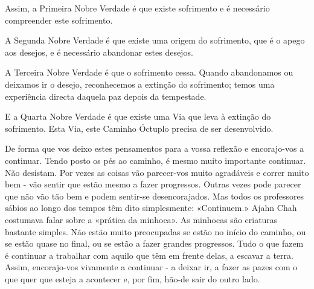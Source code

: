 Assim, a Primeira Nobre Verdade é que existe sofrimento e é necessário
compreender este sofrimento.

A Segunda Nobre Verdade é que existe uma origem do sofrimento, que é o
apego aos desejos, e é necessário abandonar estes desejos.

A Terceira Nobre Verdade é que o sofrimento cessa. Quando abandonamos ou
deixamos ir o desejo, reconhecemos a extinção do sofrimento; temos uma
experiência directa daquela paz depois da tempestade.

E a Quarta Nobre Verdade é que existe uma Via que leva à extinção do
sofrimento. Esta Via, este Caminho Óctuplo precisa de ser desenvolvido.

De forma que vos deixo estes pensamentos para a vossa reflexão e
encorajo-vos a continuar. Tendo posto os pés ao caminho, é mesmo muito
importante continuar. Não desistam. Por vezes as coisas vão parecer-vos
muito agradáveis e correr muito bem - vão sentir que estão mesmo a fazer
progressos. Outras vezes pode parecer que não vão tão bem e podem
sentir-se desencorajados. Mas todos os professores sábios ao longo dos
tempos têm dito simplesmente: «Continuem.» Ajahn Chah costumava falar
sobre a «prática da minhoca». As minhocas são criaturas bastante
simples. Não estão muito preocupadas se estão no início do caminho, ou
se estão quase no final, ou se estão a fazer grandes progressos. Tudo o
que fazem é continuar a trabalhar com aquilo que têm em frente delas, a
escavar a terra. Assim, encorajo-vos vivamente a continuar - a deixar
ir, a fazer as pazes com o que quer que esteja a acontecer e, por fim,
hão-de sair do outro lado.


